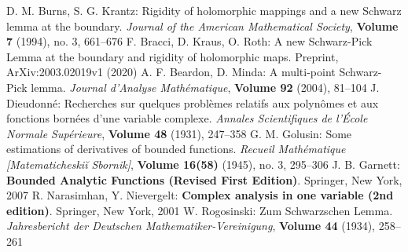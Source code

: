 \begin{thebibliography}{widest entry}
   D. M. Burns, S. G. Krantz: Rigidity of holomorphic mappings and a new Schwarz lemma at the boundary. \textit{Journal of the American Mathematical Society}, \textbf{Volume 7} (1994), no. 3, 661--676
   F. Bracci, D. Kraus, O. Roth: A new Schwarz-Pick Lemma at the boundary and rigidity of holomorphic maps. Preprint, ArXiv:2003.02019v1 (2020)
   A. F. Beardon, D. Minda: A multi-point Schwarz-Pick lemma. \textit{Journal d'Analyse Mathématique}, \textbf{Volume 92} (2004), 81--104
   J. Dieudonné: Recherches sur quelques problèmes relatifs aux polynômes et aux fonctions bornées d'une variable complexe. \textit{Annales Scientifiques de l'École Normale Supérieure}, \textbf{Volume 48} (1931), 247--358
   G. M. Golusin: Some estimations of derivatives of bounded functions. \textit{Recueil Mathématique [Matematicheskiĭ Sbornik]}, \textbf{Volume 16(58)} (1945), no. 3, 295--306
   J. B. Garnett: \textbf{Bounded Analytic Functions (Revised First Edition)}. Springer, New York, 2007
   R. Narasimhan, Y. Nievergelt: \textbf{Complex analysis in one variable (2nd edition)}. Springer, New York, 2001
   W. Rogosinski: Zum Schwarzschen Lemma. \textit{Jahresbericht der Deutschen Mathematiker-Vereinigung}, \textbf{Volume 44} (1934), 258--261
\end{thebibliography}
